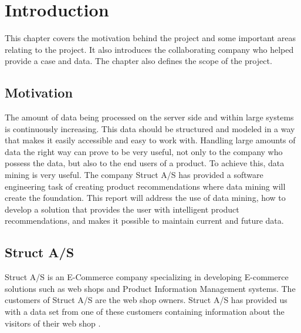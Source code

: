 
\chapter{Introduction} %

\label{ChapterX} %


This chapter covers the motivation behind the project and some important areas relating to the project. It also introduces the collaborating company who helped provide a case and data. The chapter also defines the scope of the project.

\section{Motivation}
The amount of data being processed on the server side and within large systems is continuously increasing. This data should be structured and modeled in a way that makes it easily accessible and easy to work with. Handling large amounts of data the right way can prove to be very useful, not only to the company who possess the data, but also to the end users of a product. To achieve this, data mining is very useful.
The company Struct A/S has provided a software engineering task of creating product recommendations where data mining will create the foundation. This report will address the use of data mining, how to develop a solution that provides the user with intelligent product recommendations, and makes it possible to maintain current and future data.

\section{Struct A/S}
Struct A/S is an E-Commerce company specializing in developing E-commerce solutions such as web shops and Product Information Management systems. The customers of Struct A/S are the web shop owners. Struct A/S has provided us with a data set from one of these customers containing information about the visitors of their web shop \cite{Struct}.

